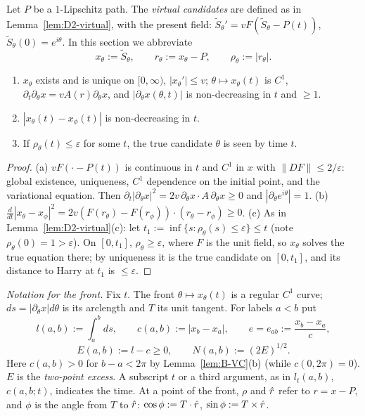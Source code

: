 Let $P$ be a $1$-Lipschitz path. The \emph{virtual candidates} are defined as in Lemma~\ref{lem:D2-virtual}, with the present field:
$\tilde S_\theta'=vF(\tilde S_\theta-P(t))$, $\tilde S_\theta(0)=e^{i\theta}$. In this section we abbreviate
\[
x_\theta:=\tilde S_\theta,\qquad r_\theta:=x_\theta-P,\qquad\rho_\theta:=|r_\theta| .
\]

\begin{lemma}\label{lem:B-VC}
\begin{enumerate}
\item[(a)] $x_\theta$ exists and is unique on $[0,\infty)$, $|x_\theta'|\le v$; $\theta\mapsto x_\theta(t)$ is $C^1$,
$\partial_t\partial_\theta x=vA(r)\partial_\theta x$, and $|\partial_\theta x(\theta,t)|$ is non-decreasing in $t$ and $\ge1$.
\item[(b)] $|x_\theta(t)-x_\phi(t)|$ is non-decreasing in $t$.
\item[(c)] If $\rho_\theta(t)\le\varepsilon$ for some $t$, the true candidate $\theta$ is seen by time $t$.
\end{enumerate}
\end{lemma}
\begin{proof}
(a) $vF(\cdot-P(t))$ is continuous in $t$ and $C^1$ in $x$ with $\|DF\|\le2/\varepsilon$: global existence, uniqueness, $C^1$
dependence on the initial point, and the variational equation. Then
$\partial_t|\partial_\theta x|^2=2v\,\partial_\theta x\cdot A\,\partial_\theta x\ge0$ and $|\partial_\theta e^{i\theta}|=1$.
(b) $\frac{d}{dt}|x_\theta-x_\phi|^2=2v(F(r_\theta)-F(r_\phi))\cdot(r_\theta-r_\phi)\ge0$. (c) As in
Lemma~\ref{lem:D2-virtual}(c): let $t_1:=\inf\{s:\rho_\theta(s)\le\varepsilon\}\le t$ (note $\rho_\theta(0)=1>\varepsilon$). On
$[0,t_1]$, $\rho_\theta\ge\varepsilon$, where $F$ is the unit field, so $x_\theta$ solves the true equation there; by uniqueness it is
the true candidate on $[0,t_1]$, and its distance to Harry at $t_1$ is $\le\varepsilon$.
\end{proof}

\emph{Notation for the front.} Fix $t$. The front $\theta\mapsto x_\theta(t)$ is a regular $C^1$ curve; $ds=|\partial_\theta x|d\theta$
is its arclength and $T$ its unit tangent. For labels $a<b$ put
\[
l(a,b):=\int_a^bds,\qquad c(a,b):=|x_b-x_a|,\qquad e=e_{ab}:=\frac{x_b-x_a}{c},
\]
\[
E(a,b):=l-c\ge0,\qquad N(a,b):=(2E)^{1/2}.
\]
Here $c(a,b)>0$ for $b-a<2\pi$ by Lemma~\ref{lem:B-VC}(b) (while $c(0,2\pi)=0$). $E$ is the \emph{two-point excess}. A subscript
$t$ or a third argument, as in $l_t(a,b)$, $c(a,b;t)$, indicates the time. At a point of the front, $\rho$ and $\hat r$ refer to
$r=x-P$, and $\phi$ is the angle from $T$ to $\hat r$: $\cos\phi:=T\cdot\hat r$, $\sin\phi:=T\times\hat r$.

